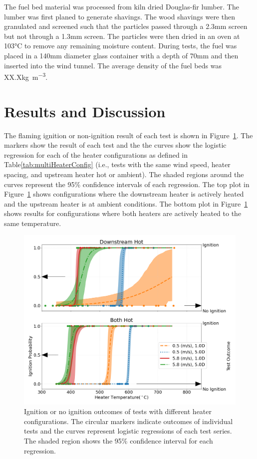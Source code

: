    The fuel bed material was processed from kiln dried Douglas-fir lumber. The lumber was first planed to generate shavings. The wood shavings were then granulated and screened such that the particles passed through a 2.3\si{\milli\meter} screen but not through a 1.3\si{\milli\meter} screen. The particles were then dried in an oven at 103\si{\celsius} to remove any remaining moisture content. During tests, the fuel was placed in a 140\si{\milli\meter} diameter glass container with a depth of 70\si{\milli\meter} and then inserted into the wind tunnel. The average density of the fuel beds was XX.X\si{\kilo\gram\per\cubic\meter}.
    
\section{Results and Discussion}
    The flaming ignition or non-ignition result of each test is shown in Figure~\ref{fig:multi_heater_hot_vs_ambient}. The markers show the result of each test and the the curves show the logistic regression for each of the heater configurations as defined in Table\ref{tab:multiHeaterConfig} (i.e., tests with the same wind speed, heater spacing, and upstream heater hot or ambient). The shaded regions around the curves represent the 95\% confidence intervals of each regression. The top plot in Figure~\ref{fig:multi_heater_hot_vs_ambient} shows configurations where the downstream heater is actively heated and the upstream heater is at ambient conditions. The bottom plot in Figure~\ref{fig:multi_heater_hot_vs_ambient} shows results for configurations where both heaters are actively heated to the same temperature.
        \begin{figure}[hpbt]
            \centering
            \includegraphics[width=0.75\columnwidth]{Figures/multi_heater_plot.png}
            \caption{Ignition or no ignition outcomes of tests with different heater configurations. The circular markers indicate outcomes of individual tests and the curves represent logistic regressions of each test series. The shaded region shows the 95\% confidence interval for each regression.}
            \label{fig:multi_heater_hot_vs_ambient}
        \end{figure}
